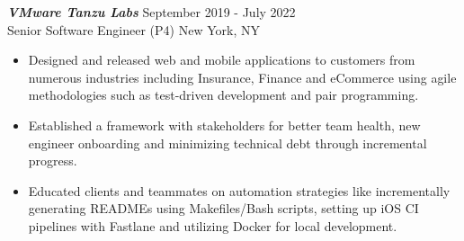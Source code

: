 {\sl \textbf{VMware Tanzu Labs}} \hfill September 2019 - July 2022 \\
Senior Software Engineer (P4) \hfill New York, NY
\begin{itemize}
    \item Designed and released web and mobile applications to customers from numerous industries including Insurance, Finance and eCommerce using agile methodologies such as test-driven development and pair programming.
    \item Established a framework with stakeholders for better team health, new engineer onboarding and minimizing technical debt through incremental progress.
    \item Educated clients and teammates on automation strategies like incrementally generating READMEs using Makefiles/Bash scripts, setting up iOS CI pipelines with Fastlane and utilizing Docker for local development.
\end{itemize}
